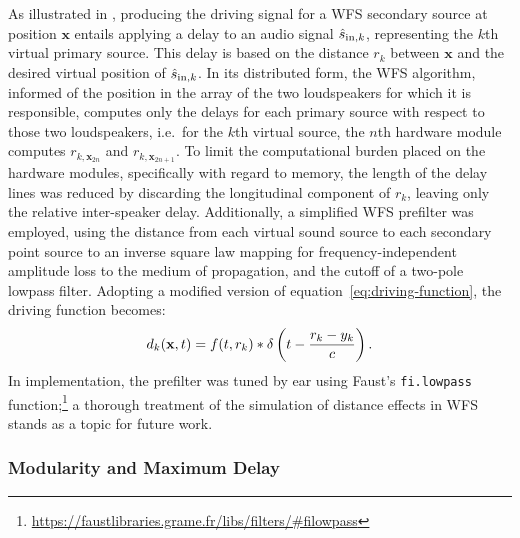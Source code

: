 As illustrated in , producing the driving signal for a WFS
secondary source at position $\mathbf{x}$ entails applying a delay to an audio
signal $\hat{s}_{\text{in},k}$, representing the $k$th virtual primary source.
This delay is based on the distance $r_k$ between $\mathbf{x}$ and the
desired virtual position of $\hat{s}_{\text{in},k}$.
In its distributed form, the WFS algorithm, informed of the position in the
array of the two loudspeakers for which it is responsible, computes only the
delays for each primary source with respect to those two loudspeakers, i.e.\
for the $k$th virtual source, the $n$th hardware module computes
$r_{k,\mathbf{x}_{2n}}$ and $r_{k,\mathbf{x}_{2n+1}}$.
To limit the computational burden placed on the hardware modules, specifically
with regard to memory, the length of the delay lines was reduced by discarding
the longitudinal component of $r_k$, leaving only the relative inter-speaker
delay.
Additionally, a simplified WFS prefilter was employed, using the distance
from each virtual sound source to each secondary point source to an inverse
square law mapping for frequency-independent amplitude loss to the medium of
propagation, and the cutoff of a two-pole lowpass filter.
Adopting a modified version of equation~\eqref{eq:driving-function}, the
driving function becomes:
\begin{equation}
    \label{eq:simple-driving-function}
    d_k(\mathbf{x},t) = f(t, r_k) \ast \delta\left(t - \frac{r_k-y_k}{c}\right).
\end{equation}
In implementation, the prefilter was tuned by ear using Faust's
\texttt{fi.lowpass} function;\footnote{
    \url{https://faustlibraries.grame.fr/libs/filters/\#filowpass}
}
a thorough treatment of the simulation of distance effects in WFS stands as a
topic for future work.

\subsubsection{Modularity and Maximum Delay}

